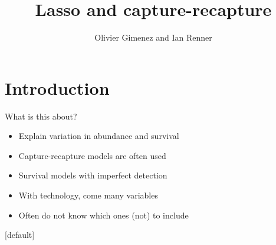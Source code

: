\documentclass[14pt]{beamer}
\title{Lasso and capture-recapture}
\subtitle{Olivier Gimenez and Ian Renner}
\date{}
\begin{document}
\maketitle

\section{Introduction}

%

\begin{frame}{What is this about?}

\begin{itemize}
\item Explain variation in abundance and survival
\item Capture-recapture models are often used
\item Survival models with imperfect detection
\item With technology, come many variables
\item Often do not know which ones (not) to include
\end{itemize}

\end{frame}

[default]
\end{document}
